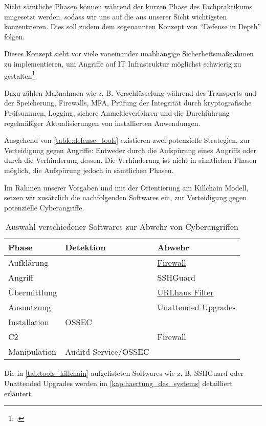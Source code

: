 
Nicht sämtliche Phasen können während der kurzen Phase des Fachpraktikums umgesetzt werden, sodass wir uns auf die aus unserer Sicht wichtigsten konzentrieren. Dies soll zudem dem sogenannten Konzept von \enquote{Defense in Depth} folgen.

Dieses Konzept sieht vor viele voneinander unabhängige Sicherheitsmaßnahmen zu implementieren, um Angriffe auf IT Infrastruktur möglichst schwierig zu gestalten\footcite[Vgl.][]{barbu2015defense}.

Dazu zählen Maßnahmen wie z. B. Verschlüsselung während des Transports und der Speicherung, Firewalls, \ac{MFA}, Prüfung der Integrität durch kryptografische Prüfsummen, Logging, sichere Anmeldeverfahren und die Durchführung regelmäßiger Aktualisierungen von installierten Anwendungen.

Ausgehend von \autoref{table:defense_tools} existieren zwei potenzielle Strategien, zur Verteidigung gegen Angriffe: Entweder durch die Aufspürung eines Angriffs oder durch die Verhinderung dessen. Die Verhinderung ist nicht in sämtlichen Phasen möglich, die Aufspürung jedoch in sämtlichen Phasen.

Im Rahmen unserer Vorgaben und mit der Orientierung am Killchain Modell, setzen wir zusätzlich die nachfolgenden Softwares ein, zur Verteidigung gegen potenzielle Cyberangriffe.

\begin{table}[ht]
    \begin{center}
        \begin{tabular}{|l|l|l|}
            \hline
            Phase        & Detektion      & Abwehr        \\ \hline
            Aufklärung   &                & \href{https://feodotracker.abuse.ch/blocklist/}{Firewall}            \\ \hline
            Angriff      &                & SSHGuard            \\ \hline
            Übermittlung &                & \href{https://gitlab.com/malware-filter/urlhaus-filter}{URLhaus Filter}     \\ \hline
            Ausnutzung   &                & Unattended Upgrades \\ \hline
            Installation & OSSEC          &                     \\ \hline
            C2           &                & Firewall            \\ \hline
            Manipulation & Auditd Service/OSSEC &                     \\ \hline
        \end{tabular}
    \end{center}
    \caption{Auswahl verschiedener Softwares zur Abwehr von Cyberangriffen}
    \label{tab:tools_killchain}
\end{table}

Die in \autoref{tab:tools_killchain} aufgelisteten Softwares wie z. B. SSHGuard oder Unattended Upgrades werden im \autoref{kap:haertung_des_systems} detailliert erläutert.